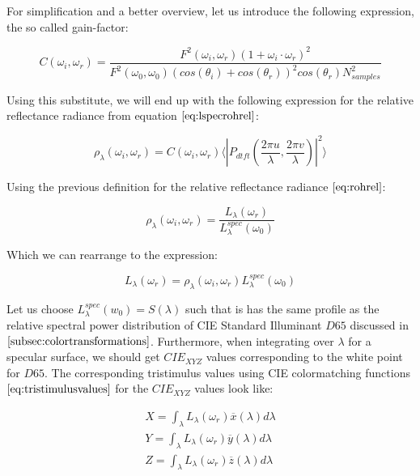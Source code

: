 For simplification and a better overview, let us introduce the following expression, the so called gain-factor:

\begin{equation} 
    C(\omega_i,\omega_r) = \frac{F^2(\omega_i,\omega_r)(1 + \omega_i \cdot \omega_r)^2}{F^2(\omega_0,\omega_0)(cos(\theta_i)+cos(\theta_r))^2 cos(\theta_r) N_{samples}^2}
\label{eq:cfact}
\end{equation}

Using this substitute, we will end up with the following expression for the relative reflectance radiance from equation $\ref{eq:lspecrohrel}$:

\begin{equation}
\rho_\lambda(\omega_i,\omega_r) =  C(\omega_i,\omega_r) \langle \left|P_{dtft}(\frac{2\pi u}{\lambda}, \frac{2\pi v}{\lambda})\right|^2\rangle
\label{eq:cpterm}
\end{equation}

Using the previous definition for the relative reflectance radiance $\ref{eq:rohrel}$:

\begin{equation}
 \rho_\lambda(\omega_i,\omega_r) = \frac{L_\lambda(\omega_r)}{L_\lambda^{spec}(\omega_0)} 
\end{equation}

Which we can rearrange to the expression: 

\begin{equation}
L_\lambda(\omega_r) = \rho_\lambda(\omega_i,\omega_r)L_\lambda^{spec}(\omega_0)
\label{eq:radianceomegarspec}
\end{equation}

Let us choose $L_\lambda^{spec}(w_0) = S(\lambda)$ such that is has the same profile as the relative spectral power distribution of CIE Standard Illuminant $D65$ discussed in $\ref{subsec:colortransformations}$. Furthermore, when integrating over $\lambda$ for a specular surface, we should get $CIE_{XYZ}$ values corresponding to the white point for $D65$. The corresponding tristimulus values using CIE colormatching functions $\ref{eq:tristimulusvalues}$ for the $CIE_{XYZ}$ values look like:

\begin{align}
X = \int_{\lambda}L_\lambda(\omega_r)\overline{x}(\lambda)d\lambda \nonumber \\
Y = \int_{\lambda}L_\lambda(\omega_r)\overline{y}(\lambda)d\lambda \nonumber \\
Z = \int_{\lambda}L_\lambda(\omega_r)\overline{z}(\lambda)d\lambda
\label{eq:tristimrad}
\end{align}

